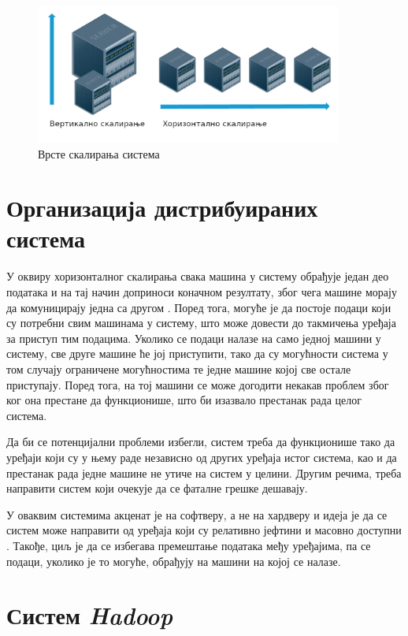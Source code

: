 \documentclass[12pt,oneside]{memoir}
\begin{document}
\begin{figure}[!ht]
  \centering
  \includegraphics[width=0.9\textwidth]{pictures/scaling.png}
  \caption{Врсте скалирања система}
  \label{fig:skaliranje}
\end{figure}

\section{Организација дистрибуираних система}
\label{sec:scaling_osobine}

У оквиру хоризонталног скалирања свака машина у систему обрађује један део података и на тај начин доприноси коначном резултату, због чега машине морају да комуницирају једна са другом \cite{hadoop_beginner}. Поред тога, могуће је да постоје подаци који су потребни свим машинама у систему, што може довести до такмичења уређаја за приступ тим подацима. Уколико се подаци налазе на само једној машини у систему, све друге машине ће јој приступити, тако да су могућности система у том случају ограничене могућностима те једне машине којој све остале приступају. Поред тога, на тој машини се може догодити некакав проблем због ког она престане да функционише, што би изазвало престанак рада целог система.

Да би се потенцијални проблеми избегли, систем треба да функционише тако да уређаји који су у њему раде независно од других уређаја истог система, као и да престанак рада једне машине не утиче на систем у целини. Другим речима, треба направити систем који очекује да се фаталне грешке дешавају. 

У оваквим системима акценат је на софтверу, а не на хардверу и идеја је да се систем може направити од уређаја који су релативно јефтини и масовно доступни \cite{hadoop_beginner}. Такође, циљ је да се избегава премештање података међу уређајима, па се подаци, уколико је то могуће, обрађују на машини на којој се налазе.

\section{Систем \textit{Hadoop}}
\label{sec:hadoop}
\end{document}
